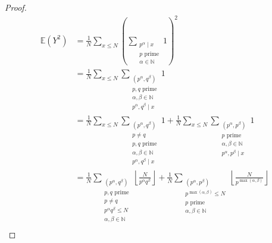 \documentclass[12pt,reqno]{amsart}
\begin{document}
\begin{proof}
\begin{align*}
\mathbb{E} \left( Y^{2} \right) & = \frac{1}{N} \sum _{x \leq N} ( \sum _{\substack{ p ^{\alpha} \mid x \\ p \text{ prime} \\ \alpha \in  \mathbb{N}  }} 1 ) ^{2} \\
& = \frac{1}{N} \sum _{x \leq N} \sum _{\substack{ (p^{\alpha},q^{\beta}) \\ p,q \text{ prime} \\ \alpha , \beta \in \mathbb{N} \\ p ^{\alpha}, q^{\beta} \mid x }} 1\\
& = \frac{1}{N} \sum _{x \leq N} \sum _{\substack{ (p^{\alpha},q^{\beta})\\ p \neq q \\ p,q \text{ prime} \\ \alpha , \beta \in \mathbb{N} \\ p ^{\alpha}, q^{\beta} \mid x }} 1 + \frac{1}{N} \sum _{x \leq N} \sum _{\substack{ (p^{\alpha},p^{\beta}) \\ p \text{ prime} \\ \alpha , \beta \in \mathbb{N} \\ p ^{\alpha}, p^{\beta} \mid x }} 1\\
& = \frac{1}{N} \sum _{\substack{ \left( p ^{\alpha} ,q^{\beta} \right) \\ p,q \text{ prime} \\ p \neq q \\ p^{\alpha}q^{\beta} \leq N \\ \alpha,\beta \in \mathbb{N}  }} \left\lfloor \frac{N}{p ^{\alpha} q ^{\beta}}  \right\rfloor + \frac{1}{N} \sum _{\substack{ (p ^{\alpha}, p ^{\beta}) \\ p ^{ \max \left( \alpha,\beta \right) }\leq N \\ p \text{ prime} \\ \alpha, \beta \in \mathbb{N}  }} \left\lfloor \frac{N}{p ^{\max \left( \alpha,\beta \right) }}  \right\rfloor \\

\end{align*}
\end{proof}
\end{document}
